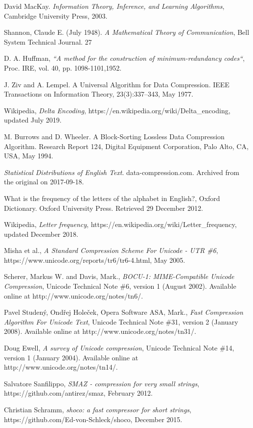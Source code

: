 \documentclass[]{article}
\begin{document}
\begin{thebibliography}{1}

	 David MacKay. {\em Information Theory, Inference, and Learning Algorithms}, Cambridge University Press, 2003.

	 Shannon, Claude E. (July 1948). {\em A Mathematical Theory of Communication}, Bell System Technical Journal. 27
 
	 D. A. Huffman, {\em“A method for the construction of minimum-redundancy codes“}, Proc. IRE, vol. 40, pp. 1098-1101,1952.
 
 	 J. Ziv and A. Lempel. A Universal Algorithm for Data Compression. IEEE Transactions on Information Theory, 23(3):337–343, May 1977.
 
  	 Wikipedia, {\em Delta Encoding}, https://en.wikipedia.org/wiki/Delta\_encoding, updated July 2019.
 
	 M. Burrows and D. Wheeler. A Block-Sorting Lossless Data Compression Algorithm. Research Report 124, Digital Equipment Corporation, Palo Alto, CA, USA, May 1994.

	 {\em Statistical Distributions of English Text}. data-compression.com. Archived from the original on 2017-09-18.

 	 What is the frequency of the letters of the alphabet in English?, Oxford Dictionary. Oxford University Press. Retrieved 29 December 2012.

	 Wikipedia, {\em Letter frequency}, https://en.wikipedia.org/wiki/Letter\_frequency, updated December 2018.

	 Misha et al., {\em A Standard Compression Scheme For Unicode - UTR \#6}, https://www.unicode.org/reports/tr6/tr6-4.html, May 2005.

	 Scherer, Markus W. and Davis, Mark., {\em BOCU-1: MIME-Compatible Unicode Compression}, Unicode Technical Note \#6, version 1 (August 2002). Available online at http://www.unicode.org/notes/tn6/. 

	 Pavel Studený, Ondřej Holeček, Opera Software ASA, Mark., {\em Fast Compression Algorithm For Unicode Text}, Unicode Technical Note \#31, version 2 (January 2008). Available online at http://www.unicode.org/notes/tn31/.

	 Doug Ewell, {\em A survey of Unicode compression}, Unicode Technical Note \#14, version 1 (January 2004). Available online at http://www.unicode.org/notes/tn14/.

 	 Salvatore Sanfilippo, {\em SMAZ - compression for very small strings}, https://github.com/antirez/smaz, February 2012.

 	 Christian Schramm, {\em shoco: a fast compressor for short strings}, https://github.com/Ed-von-Schleck/shoco, December 2015.

\end{thebibliography}
\end{document}
